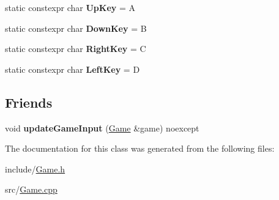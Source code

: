 \begin{DoxyCompactItemize}
static constexpr char {\bfseries Up\+Key} = \textquotesingle{}A\textquotesingle{}
\item 
\mbox{\label{classmonsterbattle_1_1Game_ae0a36646ad25ad0797943130f550a895}} 
static constexpr char {\bfseries Down\+Key} = \textquotesingle{}B\textquotesingle{}
\item 
\mbox{\label{classmonsterbattle_1_1Game_abe2341c6c9f56bbcacc224df1447808f}} 
static constexpr char {\bfseries Right\+Key} = \textquotesingle{}C\textquotesingle{}
\item 
\mbox{\label{classmonsterbattle_1_1Game_a82aafd84d1b06a48756efdff3d1bbd74}} 
static constexpr char {\bfseries Left\+Key} = \textquotesingle{}D\textquotesingle{}
\end{DoxyCompactItemize}
\subsection*{Friends}
\begin{DoxyCompactItemize}
\item 
\mbox{\label{classmonsterbattle_1_1Game_aed1def7532780b165f3237335862547f}} 
void {\bfseries update\+Game\+Input} (\hyperlink{classmonsterbattle_1_1Game}{Game} \&game) noexcept
\end{DoxyCompactItemize}


The documentation for this class was generated from the following files\+:\begin{DoxyCompactItemize}
\item 
include/\hyperlink{Game_8h}{Game.\+h}\item 
src/\hyperlink{Game_8cpp}{Game.\+cpp}\end{DoxyCompactItemize}
